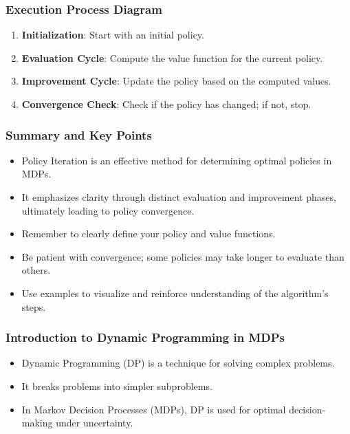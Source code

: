 \documentclass[aspectratio=169]{beamer}
\begin{document}
\begin{frame}[fragile]
    \frametitle{Execution Process Diagram}
    \begin{enumerate}
        \item \textbf{Initialization}: Start with an initial policy.
        \item \textbf{Evaluation Cycle}: Compute the value function for the current policy.
        \item \textbf{Improvement Cycle}: Update the policy based on the computed values.
        \item \textbf{Convergence Check}: Check if the policy has changed; if not, stop.
    \end{enumerate}
\end{frame}

\begin{frame}[fragile]
    \frametitle{Summary and Key Points}
    \begin{itemize}
        \item Policy Iteration is an effective method for determining optimal policies in MDPs.
        \item It emphasizes clarity through distinct evaluation and improvement phases, ultimately leading to policy convergence.
        \item Remember to clearly define your policy and value functions.
        \item Be patient with convergence; some policies may take longer to evaluate than others.
        \item Use examples to visualize and reinforce understanding of the algorithm's steps.
    \end{itemize}
\end{frame}

\begin{frame}[fragile]
    \frametitle{Introduction to Dynamic Programming in MDPs}
    \begin{itemize}
        \item Dynamic Programming (DP) is a technique for solving complex problems.
        \item It breaks problems into simpler subproblems.
        \item In Markov Decision Processes (MDPs), DP is used for optimal decision-making under uncertainty.
    \end{itemize}
\end{frame}
\end{document}
